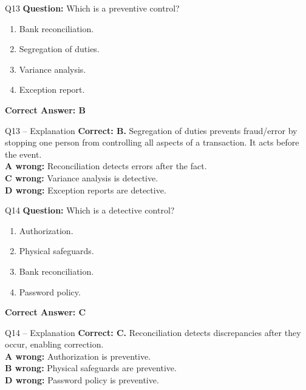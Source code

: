 \documentclass[aspectratio=169,10pt]{beamer}
\begin{document}
	\begin{frame}[t]{Q13}
		\small
		\textbf{Question:} Which is a preventive control?
		\begin{enumerate}[label=\Alph*.,itemsep=1pt,topsep=2pt]
			\item Bank reconciliation.
			\item Segregation of duties.
			\item Variance analysis.
			\item Exception report.
		\end{enumerate}
		\vspace{4pt}
		\textbf{Correct Answer: B}
	\end{frame}
	
	\begin{frame}[t]{Q13 -- Explanation}
		\small
		\textbf{Correct: B.} Segregation of duties prevents fraud/error by stopping one person from controlling all aspects of a transaction. It acts before the event. \\[4pt]
		\textbf{A wrong:} Reconciliation detects errors after the fact. \\[2pt]
		\textbf{C wrong:} Variance analysis is detective. \\[2pt]
		\textbf{D wrong:} Exception reports are detective.
	\end{frame}
	
	\begin{frame}[t]{Q14}
		\small
		\textbf{Question:} Which is a detective control?
		\begin{enumerate}[label=\Alph*.,itemsep=1pt,topsep=2pt]
			\item Authorization.
			\item Physical safeguards.
			\item Bank reconciliation.
			\item Password policy.
		\end{enumerate}
		\vspace{4pt}
		\textbf{Correct Answer: C}
	\end{frame}
	
	\begin{frame}[t]{Q14 -- Explanation}
		\small
		\textbf{Correct: C.} Reconciliation detects discrepancies after they occur, enabling correction. \\[4pt]
		\textbf{A wrong:} Authorization is preventive. \\[2pt]
		\textbf{B wrong:} Physical safeguards are preventive. \\[2pt]
		\textbf{D wrong:} Password policy is preventive.
	\end{frame}
	
\end{document}
